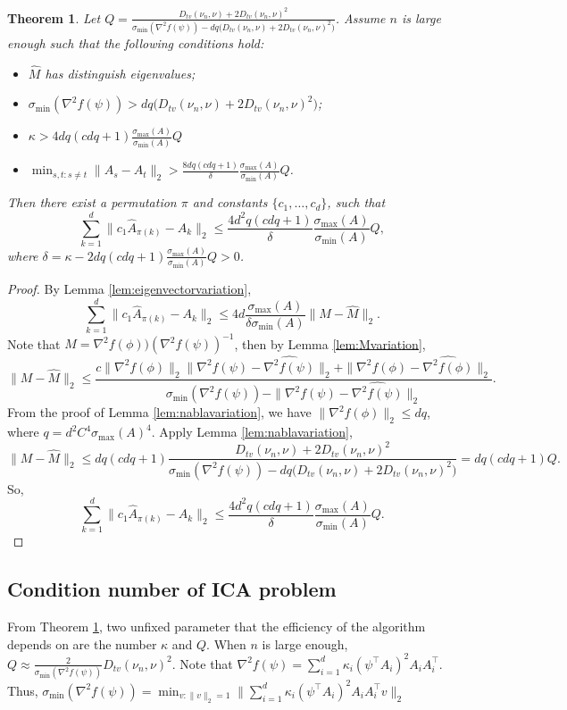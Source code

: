 \documentclass[english]{article} %
\providecommand{\theoremname}{Theorem}
\providecommand{\theoremname}{Theorem}
\theoremstyle{plain}
\newtheorem{thm}{\protect\theoremname}
\theoremstyle{remark}
\theoremstyle{claim}
\theoremstyle{plain}
\begin{document}
 \begin{thm}
 \label{thm:efficiency}
 Let $ Q= \frac{D_{tv}(\nu_n , \nu) + 2 D_{tv}(\nu_n , \nu)^2}{\sigma_{\min}(\nabla^2f(\psi)) - d q\big( D_{tv}(\nu_n , \nu) + 2 D_{tv}(\nu_n , \nu)^2\big)}$. Assume $n$ is large enough such that the following conditions hold:
 \begin{itemize}
 \item $\widehat{M}$ has distinguish eigenvalues;
 \item $\sigma_{\min}(\nabla^2f(\psi)) > d q\big( D_{tv}(\nu_n , \nu) + 2 D_{tv}(\nu_n , \nu)^2\big)$;
 \item $\kappa > 4dq(cdq+1)\frac{\sigma_{\max}(A)}{\sigma_{\min}(A)} Q$
 \item $\min_{s,t:s\neq t} \|A_s - A_t\|_2 > \frac{8dq(cdq+1)}{\delta}\frac{\sigma_{\max}(A)}{\sigma_{\min}(A) } Q$.
 \end{itemize}
 Then there exist a permutation $\pi$ and constants $\{c_1,\ldots,c_d\}$, such that
 \[
 \sum_{k=1}^{d}\| c_1\widehat{A}_{\pi(k)} - A_k\|_2 \le \frac{4d^2q(cdq+1)}{\delta} \frac{\sigma_{\max}(A)}{ \sigma_{\min}(A)}Q ,
 \]
 where $\delta = \kappa -  2 dq(cdq+1)\frac{\sigma_{\max}(A)}{\sigma_{\min}(A)}Q>0$.
 \end{thm}
 \begin{proof}
 By Lemma \ref{lem:eigenvectorvariation}, 
 \[
 \sum_{k=1}^{d}\| c_1\widehat{A}_{\pi(k)} - A_k\|_2 \le 4d  \frac{\sigma_{\max}(A)}{\delta \sigma_{\min}(A) } \|M - \widehat{M} \|_2. 
 \]
 Note that $M = \nabla^2f(\phi))(\nabla^2f(\psi))^{-1}$,  then by Lemma \ref{lem:Mvariation},
 \[
 \|M - \widehat{M} \|_2 \le \frac{c\|\nabla^2f(\phi)\|_2\|\nabla^2f(\psi) - \widehat{\nabla^2f(\psi)}\|_2+\|\nabla^2f(\phi) - \widehat{\nabla^2f(\phi)}\|_2}{\sigma_{\min}(\nabla^2f(\psi)) - \|\nabla^2f(\psi) - \widehat{\nabla^2f(\psi)}\|_2}. 
 \]
 From the proof of Lemma \ref{lem:nablavariation}, we have $\|\nabla^2 f(\phi)\|_2\le dq$, where $q = d^2C^4\sigma_{\max}(A)^4$. Apply Lemma \ref{lem:nablavariation}, 
 \[
 \|M - \widehat{M} \|_2 \le dq(cdq+1) \frac{D_{tv}(\nu_n , \nu) + 2 D_{tv}(\nu_n , \nu)^2}{\sigma_{\min}(\nabla^2f(\psi)) - d q\big( D_{tv}(\nu_n , \nu) + 2 D_{tv}(\nu_n , \nu)^2\big)}  = dq(cdq+1) Q.
 \]
 So, 
 \[
 \sum_{k=1}^{d}\| c_1\widehat{A}_{\pi(k)} - A_k\|_2 \le \frac{4d^2q(cdq+1)}{\delta} \frac{\sigma_{\max}(A)}{ \sigma_{\min}(A)}Q. 
 \]
 \end{proof}

\subsection{Condition number of ICA problem}
From Theorem \ref{thm:efficiency}, two unfixed parameter that the efficiency of the algorithm depends on are the number $\kappa$ and $Q$. 
When $n$ is large enough, $Q\approx \frac{2}{\sigma_{\min}(\nabla^2f(\psi))}D_{tv}(\nu_n , \nu)^2$. 
Note that $\nabla^2f(\psi) = \sum_{i=1}^{d} \kappa_i(\psi^{\top}A_i)^2A_iA_i^{\top}$. Thus, $\sigma_{\min}(\nabla^2f(\psi)) = \min_{v:\|v\|_2=1}\|\sum_{i=1}^{d} \kappa_i(\psi^{\top}A_i)^2A_iA_i^{\top}v\|_2$ 
\end{document}
